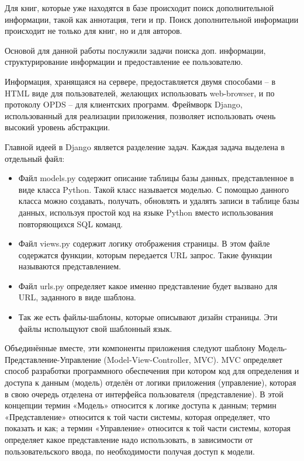 \documentclass[a4paper]{report}
\begin{document}
Для книг, которые уже находятся в базе происходит поиск дополнительной информации, такой как аннотация, теги и пр. Поиск дополнительной информации происходит не только для книг, но и для авторов.

Основой для данной работы послужили задачи поиска доп. информации, структурирование информации и предоставление ее пользователю.



Информация, хранящаяся на сервере, предоставляется двумя способами -- в HTML виде для пользователей, желающих использовать web-browser, и по протоколу OPDS -- для клиентских программ. Фреймворк Django, использованный для реализации приложения, позволяет использовать очень высокий уровень абстракции.

Главной идеей в Django является разделение задач. Каждая задача выделена в отдельный файл:
\begin{itemize}
	\item Файл models.py содержит описание таблицы базы данных, представленное в виде класса Python. Такой класс называется моделью. С помощью данного класса можно создавать, получать, обновлять и удалять записи в таблице базы данных, используя простой код на языке Python вместо использования повторяющихся SQL команд.
	\item Файл views.py содержит логику отображения страницы. В этом файле содержатся функции, которым передается URL запрос. Такие функции называются представлением.
	\item Файл urls.py определяет какое именно представление будет вызвано для URL, заданного в виде шаблона. 
	\item Так же есть файлы-шаблоны, которые описывают дизайн страницы. Эти файлы испольщуют свой шаблонный язык.
\end{itemize}

 Объединённые вместе, эти компоненты приложения следуют шаблону Модель-Представление-Управление  (Model-View-Controller, MVC). MVC определяет способ разработки программного обеспечения при котором код для определения и доступа к данным (модель) отделён от логики приложения (управление), которая в свою очередь отделена от интерфейса пользователя (представление). В этой концепции термин «Модель» относится к логике доступа к данным; термин «Представление» относится к той части системы, которая определяет, что показать и как; а термин «Управление» относится к той части системы, которая определяет какое представление надо использовать, в зависимости от пользовательского ввода, по необходимости получая доступ к модели. 
\end{document}
